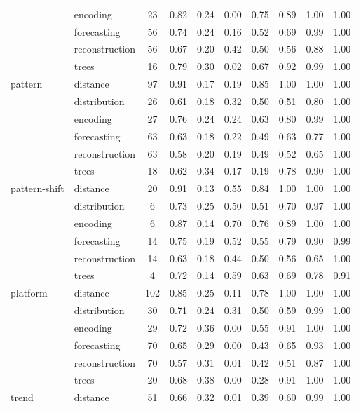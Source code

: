 \begin{tabular}{|l|l|c|c|c|c|c|c|c|c|}
 & encoding & 23 & 0.82 & 0.24 & 0.00 & 0.75 & 0.89 & 1.00 & 1.00 \\
 & forecasting & 56 & 0.74 & 0.24 & 0.16 & 0.52 & 0.69 & 0.99 & 1.00 \\
 & reconstruction & 56 & 0.67 & 0.20 & 0.42 & 0.50 & 0.56 & 0.88 & 1.00 \\
 & trees & 16 & 0.79 & 0.30 & 0.02 & 0.67 & 0.92 & 0.99 & 1.00 \\
\cline{1-10}
\multirow[t]{6}{*}{pattern} & distance & 97 & 0.91 & 0.17 & 0.19 & 0.85 & 1.00 & 1.00 & 1.00 \\
 & distribution & 26 & 0.61 & 0.18 & 0.32 & 0.50 & 0.51 & 0.80 & 1.00 \\
 & encoding & 27 & 0.76 & 0.24 & 0.24 & 0.63 & 0.80 & 0.99 & 1.00 \\
 & forecasting & 63 & 0.63 & 0.18 & 0.22 & 0.49 & 0.63 & 0.77 & 1.00 \\
 & reconstruction & 63 & 0.58 & 0.20 & 0.19 & 0.49 & 0.52 & 0.65 & 1.00 \\
 & trees & 18 & 0.62 & 0.34 & 0.17 & 0.19 & 0.78 & 0.90 & 1.00 \\
\cline{1-10}
\multirow[t]{6}{*}{pattern-shift} & distance & 20 & 0.91 & 0.13 & 0.55 & 0.84 & 1.00 & 1.00 & 1.00 \\
 & distribution & 6 & 0.73 & 0.25 & 0.50 & 0.51 & 0.70 & 0.97 & 1.00 \\
 & encoding & 6 & 0.87 & 0.14 & 0.70 & 0.76 & 0.89 & 1.00 & 1.00 \\
 & forecasting & 14 & 0.75 & 0.19 & 0.52 & 0.55 & 0.79 & 0.90 & 0.99 \\
 & reconstruction & 14 & 0.63 & 0.18 & 0.44 & 0.50 & 0.56 & 0.65 & 1.00 \\
 & trees & 4 & 0.72 & 0.14 & 0.59 & 0.63 & 0.69 & 0.78 & 0.91 \\
\cline{1-10}
\multirow[t]{6}{*}{platform} & distance & 102 & 0.85 & 0.25 & 0.11 & 0.78 & 1.00 & 1.00 & 1.00 \\
 & distribution & 30 & 0.71 & 0.24 & 0.31 & 0.50 & 0.59 & 0.99 & 1.00 \\
 & encoding & 29 & 0.72 & 0.36 & 0.00 & 0.55 & 0.91 & 1.00 & 1.00 \\
 & forecasting & 70 & 0.65 & 0.29 & 0.00 & 0.43 & 0.65 & 0.93 & 1.00 \\
 & reconstruction & 70 & 0.57 & 0.31 & 0.01 & 0.42 & 0.51 & 0.87 & 1.00 \\
 & trees & 20 & 0.68 & 0.38 & 0.00 & 0.28 & 0.91 & 1.00 & 1.00 \\
\cline{1-10}
\multirow[t]{6}{*}{trend} & distance & 51 & 0.66 & 0.32 & 0.01 & 0.39 & 0.60 & 0.99 & 1.00 \\

\end{tabular}
